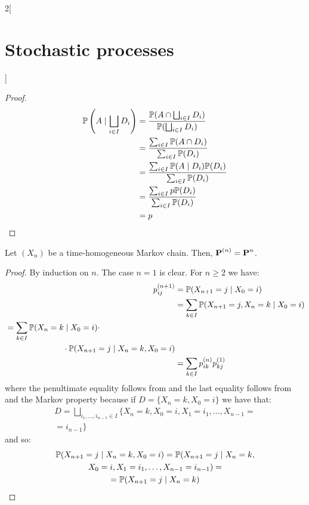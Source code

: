 \documentclass[../../../main_math.tex]{subfiles}
\begin{document}
\begin{multicols}{2}[\section{Stochastic processes}]
\begin{proof}
\begin{align*}
      \mathbb{P}\left(A\mid \bigsqcup_{i\in I}D_i\right) & =\frac{\mathbb{P}(A\cap \bigsqcup_{i\in I}D_i)}{\mathbb{P}(\bigsqcup_{i\in I}D_i)} \\
                                                    & =\frac{\sum_{i\in I}\mathbb{P}(A\cap D_i)}{\sum_{i\in I}\mathbb{P}(D_i)}           \\
                                                    & =\frac{\sum_{i\in I}\mathbb{P}(A\mid D_i)\mathbb{P}(D_i)}{\sum_{i\in I}\mathbb{P}(D_i)} \\
                                                    & =\frac{\sum_{i\in I}p\mathbb{P}(D_i)}{\sum_{i\in I}\mathbb{P}(D_i)}                \\
                                                    & =p
    \end{align*}
  \end{proof}
  \begin{theorem}
    Let $(X_n)$ be a time-homogeneous Markov chain. Then, $\boldsymbol{\mathrm{P}}^{(n)}=\boldsymbol{\mathrm{P}}^n$.
  \end{theorem}
  \begin{proof}
    By induction on $n$. The case $n=1$ is clear. For $n\geq 2$ we have:
    \begin{align*}
      p_{ij}^{(n+1)} & =\mathbb{P}(X_{n+1}=j\mid X_0=i)                     \\
                     & =\sum_{k\in I}\mathbb{P}(X_{n+1}=j, X_n=k\mid X_0=i) \\
      \begin{split}
         & =\sum_{k\in I}\mathbb{P}(X_{n}=k\mid X_0=i)\cdot          \\
         & \hspace{2.5cm}\cdot\mathbb{P}(X_{n+1}=j\mid X_n=k, X_0=i)
      \end{split}          \\
                     & =\sum_{k\in I}p_{ik}^{(n)}p_{kj}^{(1)}
    \end{align*}
    where the penultimate equality follows from  and the last equality follows from  and the Markov property because if $D=\{X_n=k, X_0=i\}$ we have that:
    \begin{multline*}
      D=\bigsqcup_{i_1,\ldots,i_{n-1}\in I}\{X_n=k, X_0=i,X_1=i_1,\ldots, X_{n-1}=\\=i_{n-1}\}
    \end{multline*}
    and so:
    \begin{multline*}
      \Prob(X_{n+1}=j\mid X_n=k, X_0=i)=\Prob(X_{n+1}=j\mid X_n=k,\\ X_0=i,X_1=i_1,\ldots,X_{n-1}=i_{n-1})=\\=\Prob(X_{n+1}=j\mid X_n=k)

\end{multline*}
\end{proof}
\end{multicols}
\end{document}
